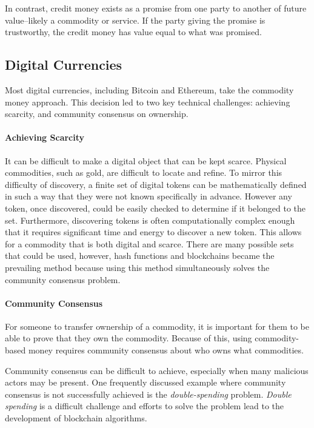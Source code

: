 \documentclass[runningheads]{llncs}
\begin{document}
In contrast, credit money exists as a promise from one party to another of future value--likely a commodity or service. If the party giving the promise is trustworthy, the credit money has value equal to what was promised.

\subsection{Digital Currencies}
Most digital currencies, including Bitcoin and Ethereum, take the commodity money approach. This decision led to two key technical challenges: achieving scarcity, and community consensus on ownership.

\paragraph{Achieving Scarcity}
It can be difficult to make a digital object that can be kept scarce.
Physical commodities, such as gold, are difficult to locate and refine. To mirror this difficulty of discovery, a finite set of digital tokens can be mathematically defined in such a way that they were not known specifically in advance. However any token, once discovered, could be easily checked to determine if it belonged to the set. Furthermore, discovering tokens is often computationally complex enough that it requires significant time and energy to discover a new token. This allows for a commodity that is both digital and scarce.
There are many possible sets that could be used, however, hash functions and blockchains became the prevailing method because using this method simultaneously solves the community consensus problem.

\paragraph{Community Consensus}
For someone to transfer ownership of a commodity, it is important for them to be able to prove that they own the commodity. Because of this, using commodity-based money requires community consensus about who owns what commodities.

Community consensus can be difficult to achieve, especially when many malicious actors may be present. One frequently discussed example where community consensus is not successfully achieved is the \emph{double-spending} problem. \emph{Double spending} is a difficult challenge and efforts to solve the problem lead to the development of blockchain algorithms. 
\end{document}
